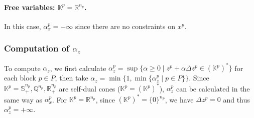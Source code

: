 \paragraph{Free variables: $\mathbb{K}^p = \mathbb{R}^{n_p}$.}
In this case, $\alpha^p_x=+\infty$ since there are no constraints on $x^p$.


\subsubsection{Computation of $\alpha_z$}
To compute $\alpha_z$, we first calculate $\alpha^p_z = \sup\{\alpha \geq 0 \mid z^p + \alpha\Delta z^p \in (\mathbb{K}^p)^*\}$ for each block $p \in P$, then take $\alpha_z=\min\{1, \min\{\alpha^p_z \mid p \in P\}\}$.
Since $\mathbb{K}^p=\mathbb{S}^{n_p}_+,\mathbb{Q}^{n_p},\mathbb{R}^{n_p}_+$ are self-dual cones ($\mathbb{K}^p = (\mathbb{K}^p)^*$), $\alpha^p_z$ can be calculated in the same way as $\alpha^p_x$.
For $\mathbb{K}^p=\mathbb{R}^{n_p}$, since $(\mathbb{K}^p)^*=\{0\}^{n_p}$, we have $\Delta z^p = 0$ and thus $\alpha^p_z=+\infty$.


